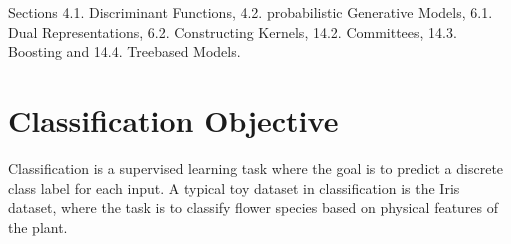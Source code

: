 \documentclass[letterpaper,10pt,english]{jupyterBook}
\begin{document}
\sphinxAtStartPar
{} Sections 4.1. Discriminant Functions, 4.2. probabilistic Generative Models, 6.1. Dual Representations, 6.2. Constructing Kernels, 14.2. Committees, 14.3. Boosting and 14.4. Tree\sphinxhyphen{}based Models.

\sphinxstepscope


\section{Classification Objective}
\label{\detokenize{classification_problem:classification-objective}}\label{\detokenize{classification_problem::doc}}
\sphinxAtStartPar
Classification is a supervised learning task where the goal is to predict a discrete class label for each input. A typical toy dataset in classification is the Iris dataset, where the task is to classify flower  species based on physical features of the plant.
\end{document}
